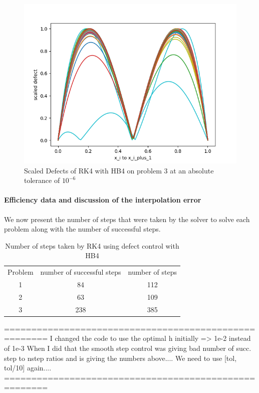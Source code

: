 \documentclass{article}
\begin{document}
\begin{figure}[H]
\centering
\includegraphics[width=0.7\linewidth]{./figures/rk4_with_hb4_p3_scaled_defects}
\caption{Scaled Defects of RK4 with HB4 on problem 3 at an absolute tolerance of $10^{-6}$}
\label{fig:rk4_with_hb4_p3_scaled_defects}
\end{figure}

\paragraph{Efficiency data and discussion of the interpolation error}
We now present the number of steps that were taken by the solver to solve each problem along with the number of successful steps.

\begin{table}[h]
\caption {Number of steps taken by RK4 using defect control with HB4} \label{tab:rk4_with_hb4_nsteps}
\begin{center}
\begin{tabular}{ c c c } 
Problem & number of successful steps & number of steps \\ 
1       & 84                         & 112 \\ 
2       & 63                         & 109 \\
3       & 238                        & 385 \\
\end{tabular}
\end{center}
\end{table}

======================================================
I changed the code to use the optimal h initially => 1e-2 instead of 1e-3
When I did that the smooth step control was giving bad number of succ. step to nstep ratios and is giving the numbers above.... We need to use [tol, tol/10] again....
======================================================
\end{document}
